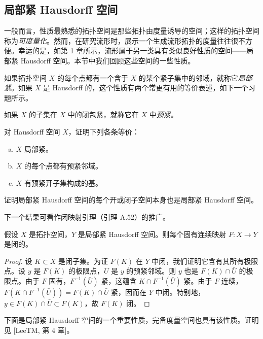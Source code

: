 \documentclass[../../main.tex]{subfiles}
\begin{document}
\subsection*{局部紧 Hausdorff 空间}

一般而言，性质最熟悉的拓扑空间是那些拓扑由度量诱导的空间；这样的拓扑空间称为\emph{可度量化}。然而，在研究流形时，展示一个生成流形拓扑的度量往往很不方便。幸运的是，如第 1 章所示，流形属于另一类具有类似良好性质的空间——局部紧 Hausdorff 空间。本节中我们回顾这些空间的一些性质。

如果拓扑空间 $X$ 的每个点都有一个含于 $X$ 的某个紧子集中的邻域，就称它\emph{局部紧}。如果 $X$ 是 Hausdorff 的，这个性质有两个常更有用的等价表述，如下一个习题所示。

如果 $X$ 的子集在 $X$ 中的闭包紧，就称它在 $X$ 中\emph{预紧}。

\begin{exercise}\label{exercise:appA-A-55}
对 Hausdorff 空间 $X$，证明下列各条等价：
\begin{enumerate}[(a)]
\item $X$ 局部紧。
\item $X$ 的每个点都有预紧邻域。
\item $X$ 有预紧开子集构成的基。
\end{enumerate}
\end{exercise}

\begin{exercise}\label{exercise:appA-A-56}
证明局部紧 Hausdorff 空间的每个开或闭子空间本身也是局部紧 Hausdorff 空间。
\end{exercise}

下一个结果可看作闭映射引理（引理 A.52）的推广。

\begin{theorem}[固有连续映射是闭映射]\label{theorem:appA-proper-continuous-closed}
假设 $X$ 是拓扑空间，$Y$ 是局部紧 Hausdorff 空间。则每个固有连续映射 $F:X\to Y$ 是闭的。
\end{theorem}

\begin{proof}
设 $K\subset X$ 是闭子集。为证 $F(K)$ 在 $Y$ 中闭，我们证明它含有其所有极限点。设 $y$ 是 $F(K)$ 的极限点，$U$ 是 $y$ 的预紧邻域。则 $y$ 也是 $F(K)\cap\bar U$ 的极限点。由于 $F$ 固有，$F^{-1}(\bar U)$ 紧，这蕴含 $K\cap F^{-1}(\bar U)$ 紧。由于 $F$ 连续，$F(K\cap F^{-1}(\bar U))=F(K)\cap\bar U$ 紧，因而在 $Y$ 中闭。特别地，$y\in F(K)\cap\bar U\subset F(K)$，故 $F(K)$ 闭。
\end{proof}

下面是局部紧 Hausdorff 空间的一个重要性质，完备度量空间也具有该性质。证明见 [LeeTM, 第 4 章]。
\end{document}
